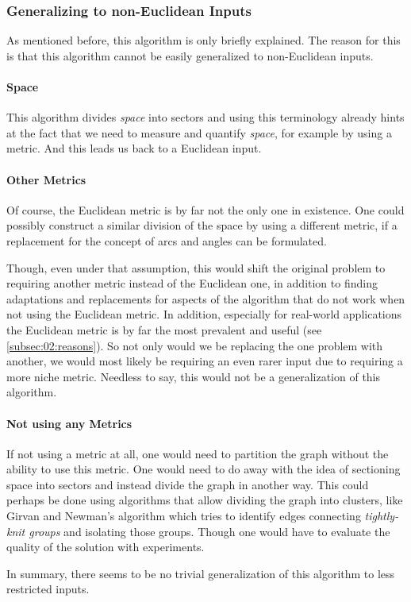 \subsubsection{Generalizing to non-Euclidean Inputs}
\label{subsubsec:03:dalgogeneralize}

As mentioned before, this algorithm is only briefly explained.
The reason for this is that this algorithm cannot be easily generalized to non-Euclidean inputs.

\paragraph{Space}
This algorithm divides \emph{space} into sectors 
and using this terminology already hints at the fact that we need to measure and quantify \emph{space}, for example by using a metric.
And this leads us back to a Euclidean input.

\label{par:03:dalgogeneralizemetrics}
\paragraph{Other Metrics} 
Of course, the Euclidean metric is by far not the only one in existence.
One could possibly construct a similar division of the space by using a different metric, if a replacement for the concept of arcs and angles can be formulated.

Though, even under that assumption, this would shift the original problem to requiring another metric instead of the Euclidean one, 
in addition to finding adaptations and replacements for aspects of the algorithm that do not work when not using the Euclidean metric.
In addition, especially for real-world applications the Euclidean metric is by far the most prevalent and useful (see \cref{subsec:02:reasons}).
So not only would we be replacing the one problem with another, we would most likely be requiring an even rarer input due to requiring a more niche metric.
Needless to say, this would not be a generalization of this algorithm.

\paragraph{Not using any Metrics}
If not using a metric at all, one would need to partition the graph without the ability to use this metric. 
One would need to do away with the idea of sectioning space into sectors and instead divide the graph in another way.
This could perhaps be done using algorithms that allow dividing the graph into clusters, like Girvan and Newman's algorithm \cite{girvan_community_2002} which tries to identify edges connecting \emph{tightly-knit groups} and isolating those groups.
Though one would have to evaluate the quality of the solution with experiments.

In summary, there seems to be no trivial generalization of this algorithm to less restricted inputs.
